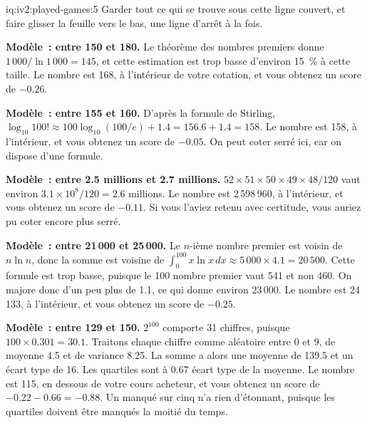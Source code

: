 \begin{solution}{iq:iv2:played-games:5}
Garder tout ce qui se trouve sous cette ligne couvert, et faire glisser la feuille vers le bas, une ligne d'arrêt à la fois.

\ivstop
\textbf{Modèle~: entre 150 et 180.} Le théorème des nombres premiers donne $1\,000/\ln 1\,000 = 145$, et cette estimation est trop basse d'environ 15~\% à cette taille. Le nombre est 168, à l'intérieur de votre cotation, et vous obtenez un score de $-0.26$.

\ivstop
\textbf{Modèle~: entre 155 et 160.} D'après la formule de Stirling, $\log_{10} 100! \approx 100\log_{10}(100/e) + 1.4 = 156.6 + 1.4 = 158$. Le nombre est 158, à l'intérieur, et vous obtenez un score de $-0.05$. On peut coter serré ici, car on dispose d'une formule.

\ivstop
\textbf{Modèle~: entre 2.5 millions et 2.7 millions.} $52 \times 51 \times 50 \times 49 \times 48/120$ vaut environ $3.1 \times 10^8/120 = 2.6$ millions. Le nombre est 2\,598\,960, à l'intérieur, et vous obtenez un score de $-0.11$. Si vous l'aviez retenu avec certitude, vous auriez pu coter encore plus serré.

\ivstop
\textbf{Modèle~: entre 21\,000 et 25\,000.} Le $n$-ième nombre premier est voisin de $n \ln n$, donc la somme est voisine de $\int_0^{100} x\ln x\,dx \approx 5\,000 \times 4.1 = 20\,500$. Cette formule est trop basse, puisque le 100 nombre premier vaut 541 et non 460. On majore donc d'un peu plus de 1.1, ce qui donne environ 23\,000. Le nombre est 24\,133, à l'intérieur, et vous obtenez un score de $-0.25$.

\ivstop
\textbf{Modèle~: entre 129 et 150.} $2^{100}$ comporte 31 chiffres, puisque $100 \times 0.301 = 30.1$. Traitons chaque chiffre comme aléatoire entre 0 et 9, de moyenne 4.5 et de variance 8.25. La somme a alors une moyenne de 139.5 et un écart type de 16. Les quartiles sont à 0.67 écart type de la moyenne. Le nombre est 115, en dessous de votre cours acheteur, et vous obtenez un score de $-0.22 - 0.66 = -0.88$. Un manqué sur cinq n'a rien d'étonnant, puisque les quartiles doivent être manqués la moitié du temps.


\end{solution}
